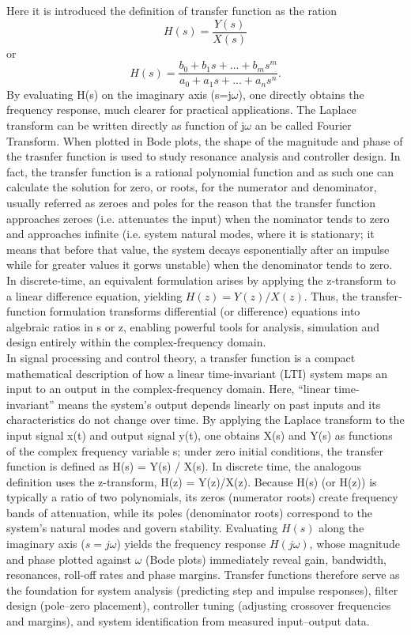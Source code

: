 Here it is introduced the definition of transfer function as the ration
$$
H(s)= \frac{Y(s)}{X(s)} 
$$
or
$$
H(s) = \frac{b_0 + b_1 s + ... + b_m s^m}{a_0 + a_1 s + ... + a_n s^n}.  
$$
By evaluating H(s) on the imaginary axis (s=j$\omega$), one directly obtains the frequency response, much clearer for practical applications. The Laplace transform can be written directly as function of j$\omega$ an be called Fourier Transform.
When plotted in Bode plots, the shape of the magnitude and phase of the trasnfer function is used to study resonance analysis and controller design. In fact, the transfer function is a rational polynomial function and as such one can calculate the solution for zero, or roots, for the numerator and denominator, usually referred as zeroes and poles for the reason that the transfer function approaches zeroes (i.e. attenuates the input) when the nominator tends to zero and approaches infinite (i.e. system natural modes, where it is stationary; it means that before that value, the system decays esponentially after an impulse while for greater values it gorws unstable) when the denominator tends to zero.
In discrete‐time, an equivalent formulation arises by applying the z‐transform to a linear difference equation, yielding $H(z)=Y(z)/X(z)$.  Thus, the transfer‐function formulation transforms differential (or difference) equations into algebraic ratios in s or z, enabling powerful tools for analysis, simulation and design entirely within the complex‐frequency domain.\\
In signal processing and control theory, a transfer function is a compact mathematical description of how a linear time-invariant (LTI) system maps an input to an output in the complex‐frequency domain. Here, “linear time-invariant” means the system’s output depends linearly on past inputs and its characteristics do not change over time. By applying the Laplace transform to the input signal x(t) and output signal y(t), one obtains X(s) and Y(s) as functions of the complex frequency variable s; under zero initial conditions, the transfer function is defined as
H(s) = Y(s) / X(s).
In discrete time, the analogous definition uses the z-transform, H(z) = Y(z)/X(z). Because H(s) (or H(z)) is typically a ratio of two polynomials, its zeros (numerator roots) create frequency bands of attenuation, while its poles (denominator roots) correspond to the system’s natural modes and govern stability. Evaluating $H(s)$ along the imaginary axis ($s = j\omega$) yields the frequency response $H(j\omega)$, whose magnitude and phase plotted against $\omega$ (Bode plots) immediately reveal gain, bandwidth, resonances, roll-off rates and phase margins. Transfer functions therefore serve as the foundation for system analysis (predicting step and impulse responses), filter design (pole–zero placement), controller tuning (adjusting crossover frequencies and margins), and system identification from measured input–output data.


